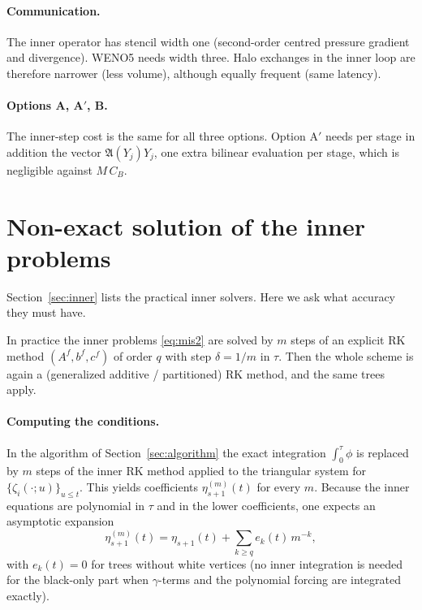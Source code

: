 \documentclass[11pt,a4paper]{article}
\theoremstyle{definition}
\theoremstyle{remark}
\begin{document}
\paragraph{Communication.}
The inner operator has stencil width one (second-order centred pressure
gradient and divergence). WENO5 needs width three. Halo exchanges in the
inner loop are therefore narrower (less volume), although equally
frequent (same latency).

\paragraph{Options A, A$'$, B.}
The inner-step cost is the same for all three options. Option A$'$
needs per stage in addition the vector $\mathfrak A(Y_j)Y_j$, one extra
bilinear evaluation per stage, which is negligible against $M\,C_B$.

\section{Non-exact solution of the inner problems}
\label{sec:nonexact}

Section~\ref{sec:inner} lists the practical inner solvers. Here we ask
what accuracy they must have.

In practice the inner problems \eqref{eq:mis2} are solved by $m$ steps of
an explicit RK method $(A^f,b^f,c^f)$ of order $q$ with step
$\delta=1/m$ in $\tau$. Then the whole scheme is again a (generalized
additive / partitioned) RK method, and the same trees apply.

\paragraph{Computing the conditions.}
In the algorithm of Section~\ref{sec:algorithm} the exact integration
$\int_0^\tau\phi$ is replaced by $m$ steps of the inner RK method
applied to the triangular system for $\{\zeta_i(\cdot;u)\}_{u\le t}$.
This yields coefficients $\eta^{(m)}_{s+1}(t)$ for every $m$. Because
the inner equations are polynomial in $\tau$ and in the lower
coefficients, one expects an asymptotic expansion
\begin{equation*}
 \eta^{(m)}_{s+1}(t)=\eta_{s+1}(t)+\sum_{k\ge q}e_k(t)\,m^{-k},
\end{equation*}
with $e_k(t)=0$ for trees without white vertices (no inner
integration is needed for the black-only part when $\gamma$-terms and the
polynomial forcing are integrated exactly).
\end{document}
